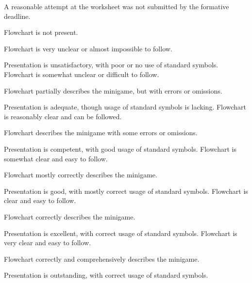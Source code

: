 \documentclass{../../../fal_assignment}
\begin{document}
\rubrichead{\ }
\begin{markingrubric}
		\grade\fail	A reasonable attempt at the worksheet was not submitted by the formative deadline.
		
        \grade\fail Flowchart is not present.
			\par Flowchart is very unclear or almost impossible to follow.
			\par Presentation is unsatisfactory, with poor or no use of standard symbols.
        \grade Flowchart is somewhat unclear or difficult to follow.
			\par Flowchart partially describes the minigame, but with errors or omissions.
			\par Presentation is adequate, though usage of standard symbols is lacking.
        \grade Flowchart is reasonably clear and can be followed.
			\par Flowchart describes the minigame with some errors or omissions.
			\par Presentation is competent, with good usage of standard symbols.
        \grade Flowchart is somewhat clear and easy to follow.
			\par Flowchart mostly correctly describes the minigame.
			\par Presentation is good, with mostly correct usage of standard symbols.
        \grade Flowchart is clear and easy to follow.
			\par Flowchart correctly describes the minigame.
			\par Presentation is excellent, with correct usage of standard symbols.
        \grade Flowchart is very clear and easy to follow.
			\par Flowchart correctly and comprehensively describes the minigame.
			\par Presentation is outstanding, with correct usage of standard symbols.


\end{markingrubric}
\end{document}
